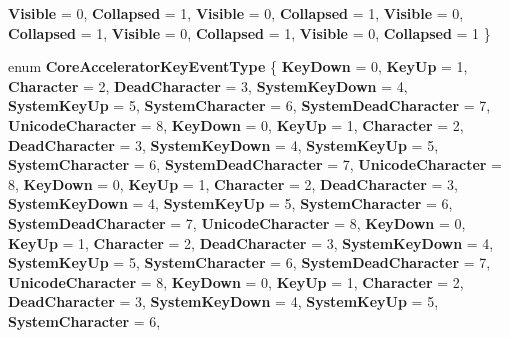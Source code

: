 \begin{DoxyCompactItemize}
{\bfseries Visible} = 0, 
{\bfseries Collapsed} = 1, 
{\bfseries Visible} = 0, 
{\bfseries Collapsed} = 1, 
\newline
{\bfseries Visible} = 0, 
{\bfseries Collapsed} = 1, 
{\bfseries Visible} = 0, 
{\bfseries Collapsed} = 1, 
\newline
{\bfseries Visible} = 0, 
{\bfseries Collapsed} = 1
 \}
\item 
\mbox{\label{namespace_windows_1_1_u_i_1_1_core_a3b4a4c6a338426f7356d6fbe21e0541e}} 
enum {\bfseries Core\+Accelerator\+Key\+Event\+Type} \{ \newline
{\bfseries Key\+Down} = 0, 
{\bfseries Key\+Up} = 1, 
{\bfseries Character} = 2, 
{\bfseries Dead\+Character} = 3, 
\newline
{\bfseries System\+Key\+Down} = 4, 
{\bfseries System\+Key\+Up} = 5, 
{\bfseries System\+Character} = 6, 
{\bfseries System\+Dead\+Character} = 7, 
\newline
{\bfseries Unicode\+Character} = 8, 
{\bfseries Key\+Down} = 0, 
{\bfseries Key\+Up} = 1, 
{\bfseries Character} = 2, 
\newline
{\bfseries Dead\+Character} = 3, 
{\bfseries System\+Key\+Down} = 4, 
{\bfseries System\+Key\+Up} = 5, 
{\bfseries System\+Character} = 6, 
\newline
{\bfseries System\+Dead\+Character} = 7, 
{\bfseries Unicode\+Character} = 8, 
{\bfseries Key\+Down} = 0, 
{\bfseries Key\+Up} = 1, 
\newline
{\bfseries Character} = 2, 
{\bfseries Dead\+Character} = 3, 
{\bfseries System\+Key\+Down} = 4, 
{\bfseries System\+Key\+Up} = 5, 
\newline
{\bfseries System\+Character} = 6, 
{\bfseries System\+Dead\+Character} = 7, 
{\bfseries Unicode\+Character} = 8, 
{\bfseries Key\+Down} = 0, 
\newline
{\bfseries Key\+Up} = 1, 
{\bfseries Character} = 2, 
{\bfseries Dead\+Character} = 3, 
{\bfseries System\+Key\+Down} = 4, 
\newline
{\bfseries System\+Key\+Up} = 5, 
{\bfseries System\+Character} = 6, 
{\bfseries System\+Dead\+Character} = 7, 
{\bfseries Unicode\+Character} = 8, 
\newline
{\bfseries Key\+Down} = 0, 
{\bfseries Key\+Up} = 1, 
{\bfseries Character} = 2, 
{\bfseries Dead\+Character} = 3, 
\newline
{\bfseries System\+Key\+Down} = 4, 
{\bfseries System\+Key\+Up} = 5, 
{\bfseries System\+Character} = 6, 

\end{DoxyCompactItemize}
